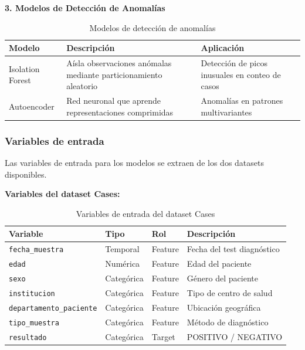 \documentclass[12pt,a4paper]{article}
\begin{document}
\textbf{3. Modelos de Detección de Anomalías}

\begin{table}[H]
    \centering
    \caption{Modelos de detección de anomalías}
    \begin{tabular}{@{}lp{5.5cm}p{5.5cm}@{}}
        \toprule
        \textbf{Modelo}  & \textbf{Descripción}                                             & \textbf{Aplicación}                             \\
        \midrule
        Isolation Forest & Aísla observaciones anómalas mediante particionamiento aleatorio & Detección de picos inusuales en conteo de casos \\[6pt]
        Autoencoder      & Red neuronal que aprende representaciones comprimidas            & Anomalías en patrones multivariantes            \\
        \bottomrule
    \end{tabular}
\end{table}

\subsubsection{Variables de entrada}\label{variables-de-entrada}

Las variables de entrada para los modelos se extraen de los dos datasets disponibles.

\textbf{Variables del dataset Cases:}

\begin{table}[H]
    \centering
    \caption{Variables de entrada del dataset Cases}
    \begin{tabular}{@{}llll@{}}
        \toprule
        \textbf{Variable}               & \textbf{Tipo} & \textbf{Rol} & \textbf{Descripción}       \\
        \midrule
        \texttt{fecha\_muestra}         & Temporal      & Feature      & Fecha del test diagnóstico \\
        \texttt{edad}                   & Numérica      & Feature      & Edad del paciente          \\
        \texttt{sexo}                   & Categórica    & Feature      & Género del paciente        \\
        \texttt{institucion}            & Categórica    & Feature      & Tipo de centro de salud    \\
        \texttt{departamento\_paciente} & Categórica    & Feature      & Ubicación geográfica       \\
        \texttt{tipo\_muestra}          & Categórica    & Feature      & Método de diagnóstico      \\
        \texttt{resultado}              & Categórica    & Target       & POSITIVO / NEGATIVO        \\
        \bottomrule
    \end{tabular}
\end{table}
\end{document}
